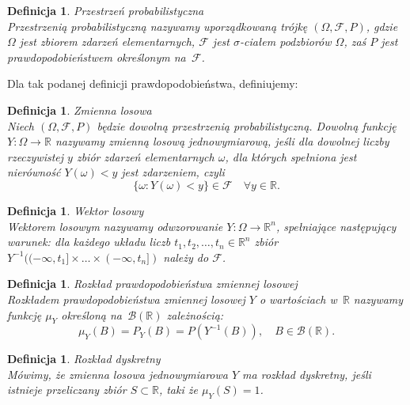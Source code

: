 \documentclass[12pt,a4paper]{report}
\newtheorem{definition}[theorem]{Definicja}
\begin{document}
\begin{definition}{Przestrzeń probabilistyczna \cite[w oparciu o rozdział 1.2]{krysicki1999}}\\
Przestrzenią probabilistyczną nazywamy uporządkowaną trójkę $(\Omega, \mathcal{F}, P)$, gdzie $\Omega$ jest zbiorem zdarzeń elementarnych, $\mathcal{F}$ jest $\sigma$-ciałem podzbiorów $\Omega$, zaś $P$ jest prawdopodobieństwem określonym na~$\mathcal{F}$.
\end{definition}

Dla tak podanej definicji prawdopodobieństwa, definiujemy:

\begin{definition}{Zmienna losowa \cite[Rozdział 2.1]{krysicki1999}}\\
Niech $(\Omega, \mathcal{F}, P)$ będzie dowolną przestrzenią probabilistyczną. Dowolną funkcję $\textit{Y} : \Omega \rightarrow \mathbb{R}$ nazywamy zmienną losową jednowymiarową, jeśli dla dowolnej liczby rzeczywistej $y$ zbiór zdarzeń elementarnych $\omega$, dla których spełniona jest nierówność $Y(\omega)< y$ jest zdarzeniem, czyli 
$$\{\omega: Y(\omega) < y \} \in \mathcal{F}\quad \forall y \in \mathbb{R}.$$

\end{definition}


\begin{definition}{Wektor losowy \cite[Rozdział 5.1]{jakubowski2004}}\\
Wektorem losowym nazywamy odwzorowanie $Y:\Omega \rightarrow \mathbb{R}^n$, spełniające następujący warunek: dla każdego układu liczb $t_1,t_2,\ldots,t_n \in \mathbb{R}^n$ zbiór $Y^{-1}((-\infty,t_1]\times \ldots \times(-\infty,t_n])$ należy do $\mathcal{F}$.
\end{definition}


\begin{definition}{Rozkład prawdopodobieństwa zmiennej losowej \cite[Rozdział 5.1]{jakubowski2004}}\\
Rozkładem prawdopodobieństwa zmiennej losowej $Y$ o wartościach w~$\mathbb{R}$ nazywamy funkcję $\mu_Y$ określoną na~$\mathcal{B}(\mathbb{R})$ zależnością:
$$\mu_Y(B)=P_Y(B)=P(Y^{-1}(B)), \quad B \in \mathcal{B}(\mathbb{R}).$$
 
\end{definition}


\begin{definition}{Rozkład dyskretny \cite[Rozdział 5.1]{jakubowski2004}}\\
Mówimy, że zmienna losowa jednowymiarowa $Y$ ma rozkład dyskretny, jeśli istnieje przeliczany zbiór $S \subset \mathbb{R}$, taki że $\mu_Y(S)=1$.
\end{definition}
\end{document}
